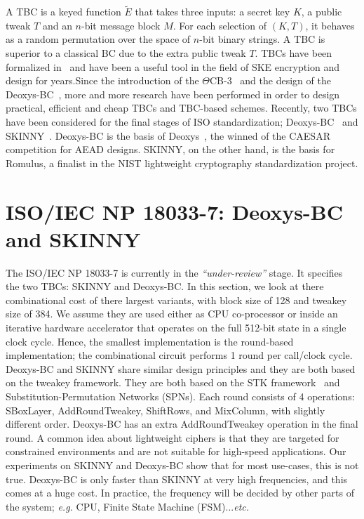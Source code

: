 \documentclass[conference]{IEEEtran}
\begin{document}
A TBC is a keyed function $\tilde{E}$ that takes three inputs: a secret key $K$, a public tweak $T$ and an $n$-bit message block $M$. For each selection of $(K,T)$, it behaves as a random permutation over the space of $n$-bit binary strings. A TBC is superior to a classical BC due to the extra public tweak $T$. TBCs have been formalized in~\cite{liskov} and have been a useful tool in the field of SKE encryption and design for years.Since the introduction of the $\Theta$CB-3~\cite{} and the design of the Deoxys-BC~\cite{}, more and more research have been performed in order to design practical, efficient and cheap TBCs and TBC-based schemes. Recently, two TBCs have been considered for the final stages of ISO standardization; Deoxys-BC~\cite{} and SKINNY~\cite{}. Deoxys-BC is the basis of Deoxys~\cite{}, the winned of the CAESAR competition for AEAD designs. SKINNY, on the other hand, is the basis for Romulus, a finalist in the NIST lightweight cryptography standardization project. 

\section{ISO/IEC NP 18033-7: Deoxys-BC and SKINNY}

The ISO/IEC NP 18033-7 is currently in the {\it ``under-review''} stage. It specifies the two TBCs: SKINNY and Deoxys-BC. In this section, we look at there combinational cost of there largest variants, with block size of 128 and tweakey size of 384. We assume they are used either as CPU co-processor or inside an iterative hardware accelerator that operates on the full 512-bit state in a single clock cycle. Hence, the smallest implementation is the round-based implementation; the combinational circuit performs 1 round per call/clock cycle. Deoxys-BC and SKINNY share similar design principles and they are both based on the tweakey framework. They are both based on the STK framework~\cite{} and Substitution-Permutation Networks (SPNs). Each round consists of 4 operations: SBoxLayer, AddRoundTweakey, ShiftRows, and MixColumn, with slightly different order. Deoxys-BC has an extra AddRoundTweakey operation in the final round. A common idea about lightweight ciphers is that they are targeted for constrained environments and are not suitable for high-speed applications. Our experiments on SKINNY and Deoxys-BC show that for most use-cases, this is not true. Deoxys-BC is only faster than SKINNY at very high frequencies, and this comes at a huge cost. In practice, the frequency will be decided by other parts of the system; {\it e.g.} CPU, Finite State Machine (FSM)...{\it etc.} 
\end{document}
